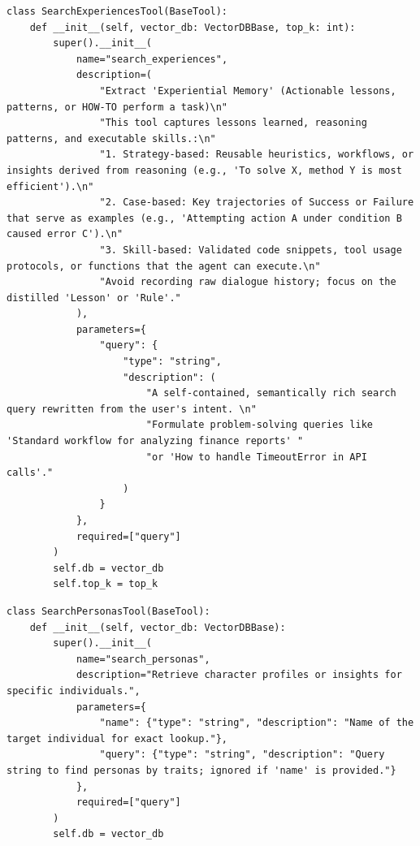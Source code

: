\documentclass[11pt, a4paper]{lumia}
\begin{document}
\begin{tcolorbox}[title={SearchExperiencesTool}, sharp corners, breakable, 
      colframe=Periwinkle, colback=white, 
        boxrule=3pt, boxsep=0.5pt, enhanced, 
        shadow={3pt}{-3pt}{0pt}{opacity=1}]
        \footnotesize
        {\selectfont
\begin{lstlisting}[breaklines=true,showstringspaces=false]
class SearchExperiencesTool(BaseTool):
    def __init__(self, vector_db: VectorDBBase, top_k: int):
        super().__init__(
            name="search_experiences",
            description=(
                "Extract 'Experiential Memory' (Actionable lessons, patterns, or HOW-TO perform a task)\n"
                "This tool captures lessons learned, reasoning patterns, and executable skills.:\n"
                "1. Strategy-based: Reusable heuristics, workflows, or insights derived from reasoning (e.g., 'To solve X, method Y is most efficient').\n"
                "2. Case-based: Key trajectories of Success or Failure that serve as examples (e.g., 'Attempting action A under condition B caused error C').\n"
                "3. Skill-based: Validated code snippets, tool usage protocols, or functions that the agent can execute.\n"
                "Avoid recording raw dialogue history; focus on the distilled 'Lesson' or 'Rule'."
            ),
            parameters={
                "query": {
                    "type": "string",
                    "description": (
                        "A self-contained, semantically rich search query rewritten from the user's intent. \n"
                        "Formulate problem-solving queries like 'Standard workflow for analyzing finance reports' "
                        "or 'How to handle TimeoutError in API calls'."
                    )
                }
            },
            required=["query"]
        )
        self.db = vector_db
        self.top_k = top_k
\end{lstlisting}
}
\end{tcolorbox}

\begin{tcolorbox}[title={SearchPersonasTool}, sharp corners, breakable, 
      colframe=Periwinkle, colback=white, 
        boxrule=3pt, boxsep=0.5pt, enhanced, 
        shadow={3pt}{-3pt}{0pt}{opacity=1}]
        \footnotesize
        {\selectfont
\begin{lstlisting}[breaklines=true,showstringspaces=false]
class SearchPersonasTool(BaseTool):
    def __init__(self, vector_db: VectorDBBase):
        super().__init__(
            name="search_personas",
            description="Retrieve character profiles or insights for specific individuals.",
            parameters={
                "name": {"type": "string", "description": "Name of the target individual for exact lookup."},
                "query": {"type": "string", "description": "Query string to find personas by traits; ignored if 'name' is provided."}
            },
            required=["query"]
        )
        self.db = vector_db
\end{lstlisting}
}
\end{tcolorbox}
\end{document}
